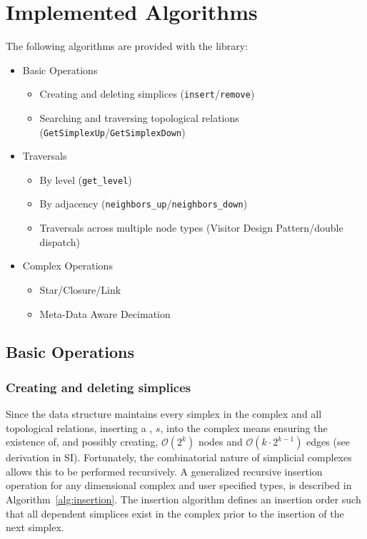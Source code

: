 \section{Implemented Algorithms}\label{sec:algorithms}

	\par The following algorithms are provided with the \asc library:
	\begin{itemize}
		\item Basic Operations
			\begin{itemize}
				\item Creating and deleting simplices (\verb|insert|/\verb|remove|)
				\item Searching and traversing topological relations (\verb|GetSimplexUp|/\verb|GetSimplexDown|)
			\end{itemize}

		\item Traversals
			\begin{itemize}
				\item By level (\verb|get_level|)
				\item By adjacency (\verb|neighbors_up|/\verb|neighbors_down|)
				\item Traversals across multiple node types (Visitor Design Pattern/double dispatch)
			\end{itemize}

		\item Complex Operations
			\begin{itemize}
				\item Star/Closure/Link
				\item Meta-Data Aware Decimation
			\end{itemize}
	\end{itemize}

	\subsection{Basic Operations}
	\subsubsection{Creating and deleting simplices}
		\par Since the \asc data structure maintains every simplex in the complex and all topological relations, inserting a , $s$, into the complex means ensuring the existence of, and possibly creating, $\mathcal{O}(2^{k})$ nodes and $\mathcal{O}(k\cdot2^{k-1})$ edges (see derivation in SI).
		Fortunately, the combinatorial nature of simplicial complexes allows this to be performed recursively.
		A generalized recursive insertion operation for any dimensional complex and user specified types, is described in Algorithm~\ref{alg:insertion}.
		The insertion algorithm defines an insertion order such that all dependent simplices exist in the complex prior to the insertion of the next simplex.

